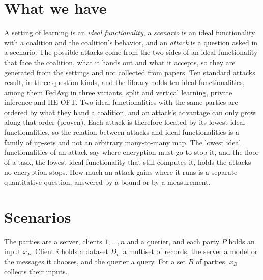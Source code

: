 \documentclass{labreport}
\begin{document}
\lrmaketitle

\section{What we have}

A setting of learning is an \emph{ideal functionality}, a \emph{scenario} is an ideal functionality with a coalition and the coalition's behavior, and an \emph{attack} is a question asked in a scenario.
The possible attacks come from the two sides of an ideal functionality that face the coalition, what it hands out and what it accepts, so they are generated from the settings and not collected from papers.
Ten standard attacks result, in three question kinds, and the library holds ten ideal functionalities, among them FedAvg in three variants, split and vertical learning, private inference and HE-OFT.
Two ideal functionalities with the same parties are ordered by what they hand a coalition, and an attack's advantage can only grow along that order (proven).
Each attack is therefore located by its lowest ideal functionalities, so the relation between attacks and ideal functionalities is a family of up-sets and not an arbitrary many-to-many map.
The lowest ideal functionalities of an attack say where encryption must go to stop it, and the floor of a task, the lowest ideal functionality that still computes it, holds the attacks no encryption stops.
How much an attack gains where it runs is a separate quantitative question, answered by a bound or by a measurement.


\section{Scenarios}

The parties are a server, clients $1,\dots,n$ and a querier, and each party $P$ holds an input $x_P$.
Client $i$ holds a dataset $D_i$, a multiset of records, the server a model or the messages it chooses, and the querier a query.
For a set $B$ of parties, $x_B$ collects their inputs.
\end{document}
